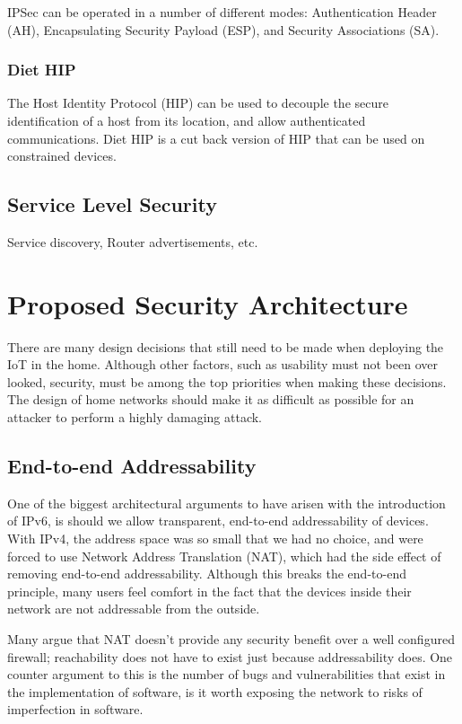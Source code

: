 \documentclass[10pt,journal,compsoc]{IEEEtran}
\begin{document}
IPSec can be operated in a number of different modes: Authentication Header
(AH), Encapsulating Security Payload (ESP), and Security Associations (SA).

\subsubsection{Diet HIP}
The Host Identity Protocol (HIP) can be used to decouple the secure
identification of a host from its location, and allow authenticated
communications. Diet HIP is a cut back version of HIP that can be used on
constrained devices. 

\subsection{Service Level Security}
Service discovery, Router advertisements, etc.

\section{Proposed Security Architecture}
There are many design decisions that still need to be made when deploying the
IoT in the home. Although other factors, such as usability must not been over
looked, security, must be among the top priorities when making these decisions.
The design of home networks should make it as difficult as possible for an
attacker to perform a highly damaging attack. 

\subsection{End-to-end Addressability}
One of the biggest architectural arguments to have arisen with the introduction
of IPv6, is should we allow transparent, end-to-end addressability of devices.
With IPv4, the address space was so small that we had no choice, and were
forced to use Network Address Translation (NAT), which had the side effect of
removing end-to-end addressability. Although this breaks the end-to-end
principle, many users feel comfort in the fact that the devices inside their
network are not addressable from the outside.  

Many argue that NAT doesn't provide any security benefit over a well configured
firewall; reachability does not have to exist just because addressability does.
One counter argument to this is the number of bugs and vulnerabilities that
exist in the implementation of software, is it worth exposing the network to
risks of imperfection in software.
\end{document}
